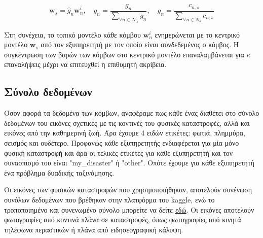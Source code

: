 \vspace{-5pt}

\begin{equation}
   \mathbf{w}_s = \hat{g}_n \mathbf{w}_n^i, \quad \hat{g}_n = \frac{g_n}{\sum\limits_{\forall n \in \mathcal{N}_s} g_n}, \quad g_n = \frac{c_{n,s}}{\sum\limits_{\forall n \in N_s} c_{n,s}}
    \label{eq15}
\end{equation}

\vspace{-5pt}

Στη συνέχεια, το τοπικό μοντέλο κάθε κόμβου $\mathbf{w}_n^i$ ενημερώνεται με το κεντρικό μοντέλο $\mathbf{w}_s$ από τον εξυπηρετητή με τον οποίο είναι συνδεδεμένος ο κόμβος. Η συγκέντρωση των βαρών των κόμβων στο κεντρικό μοντέλο επαναλαμβάνεται για $\kappa$ επαναλήψεις μέχρι να επιτευχθεί η επιθυμητή ακρίβεια.

\subsection{Σύνολο δεδομένων}

Όσον αφορά τα δεδομένα των κόμβων, αναφέραμε πως κάθε ένας διαθέτει στο σύνολο δεδομένων του εικόνες σχετικές με τις κοντινές του φυσικές καταστροφές, αλλά και εικόνες από την καθημερινή ζωή. Άρα έχουμε 4 ειδών ετικέτες: φωτιά, πλημμύρα, σεισμός και ουδέτερο. Προφανώς κάθε εξυπηρετητής ενδιαφέρεται για μία μόνο φυσική καταστροφή και άρα οι τελικές ετικέτες για κάθε εξυπηρετητή και τον συνασπισμό του είναι "my\_disaster" ή "other". Οπότε έχουμε για κάθε εξυπηρετητή ένα πρόβλημα δυαδικής ταξινόμησης.

Οι εικόνες των φυσικών καταστροφών που χρησιμοποιήθηκαν, αποτελούν συνένωση συνόλων δεδομένων που βρέθηκαν στην πλατφόρμα του kaggle, ενώ το τροποποιημένο και συνενωμένο σύνολο μπορείτε να δείτε \href{https://www.kaggle.com/datasets/georgemystriotis/disasters-dataset}{\underline{εδώ}}. Οι εικόνες αποτελούν φωτογραφίες από κοντινά πλάνα σε καταστροφές, όπως φωτογραφίες από κινητά τηλέφωνα περαστικών ή πλάνα από ειδησεογραφική κάλυψη.


